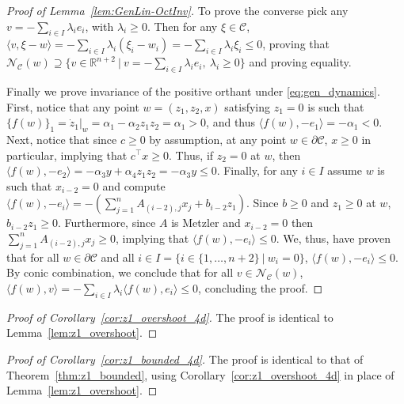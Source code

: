 \documentclass{article}
\begin{document}
\begin{proof}[Proof of Lemma~\ref{lem:GenLin-OctInv}]
    To prove the converse pick any $v=-\sum_{i\in I}\lambda_ie_i$, with $\lambda_i\ge0$. Then for any $\xi\in \mathcal{C}$, $\langle v,\xi-w\rangle = -\sum_{i\in I}\lambda_i(\xi_i-w_i)=-\sum_{i\in I}\lambda_i\xi_i\leq 0$, proving that $\mathcal{N}_{\mathcal{C}}(w)\supseteq\{v\in\mathbb{R}^{n+2}~|~v=-\sum_{i\in I}\lambda_ie_i,~\lambda_i\ge0\}$ and proving equality.

    Finally we prove invariance of the positive orthant under \eqref{eq:gen_dynamics}. First, notice that any point $w=(z_1,z_2,x)$ satisfying $z_1=0$ is such that $\{f(w)\}_1 = \dot z_1|_{w} = \alpha_1-\alpha_2z_1z_2 = \alpha_1>0$, and thus $\langle f(w),-e_1\rangle = -\alpha_1<0 $. Next, notice that since $c\geq 0$ by assumption, at any point $w\in\partial \mathcal{C}$, $x\geq 0$ in particular, implying that $c^\top x\geq 0$. Thus, if $z_2=0$ at $w$, then $\langle f(w),-e_2\rangle = -\alpha_3y+\alpha_4z_1z_2 = -\alpha_3y\leq 0$. Finally, for any $i\in I$ assume $w$ is such that $x_{i-2}=0$ and compute $\langle f(w),-e_i \rangle = -(\sum_{j=1}^{n}A_{(i-2),j}x_j+b_{i-2}z_1)$. Since $b\geq 0$ and $z_1\geq0$ at $w$, $b_{i-2}z_1\geq0$. Furthermore, since $A$ is Metzler and $x_{i-2}=0$ then $\sum_{j=1}^{n}A_{(i-2),j}x_j\ge0$, implying that $\langle f(w),-e_i \rangle\leq 0$. We, thus, have proven that for all $w\in\partial \mathcal{C}$ and all $i\in I=\{i\in\{1,\dots, n+2\}~|~w_i=0\}$, $\langle f(w),-e_i\rangle \le0$. By conic combination, we conclude that for all $v\in\mathcal{N}_{\mathcal{C}}(w)$, $\langle f(w),v\rangle=-\sum_{i\in I}\lambda_i\langle f(w),e_i\rangle\leq 0$, concluding the proof.
\end{proof}

\begin{proof}[Proof of Corollary~\ref{cor:z1_overshoot_4d}]
    The proof is identical to Lemma~\ref{lem:z1_overshoot}.
\end{proof}

\begin{proof}[Proof of Corollary~\ref{cor:z1_bounded_4d}]
    The proof is identical to that of Theorem~\ref{thm:z1_bounded}, using 
    Corollary~\ref{cor:z1_overshoot_4d} in place of Lemma~\ref{lem:z1_overshoot}.
\end{proof}
\end{document}
